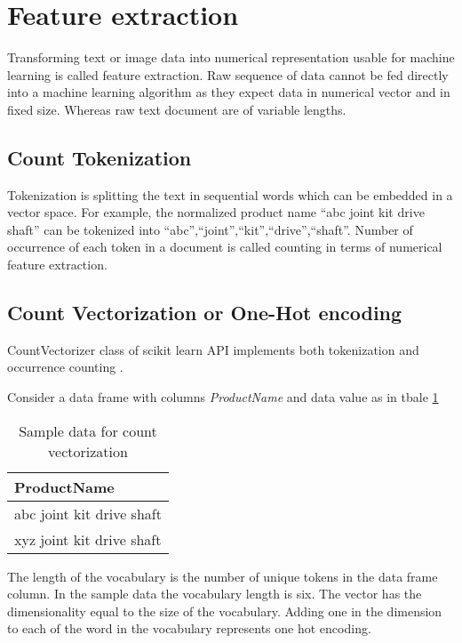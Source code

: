 \section{Feature extraction} \label{ch:feature-extraction}

Transforming text or image data into numerical representation usable for machine learning is called feature extraction. Raw sequence of data cannot be fed directly into a machine learning algorithm as they expect data in numerical vector and in fixed size. Whereas raw text document are of variable lengths. 

\subsection{Count Tokenization}

Tokenization is splitting the text in sequential words which can be embedded in a vector space.
For example, the normalized product name ``abc joint kit drive shaft'' can be tokenized into  ``abc'',``joint'',``kit'',``drive'',``shaft''. Number of occurrence of each token in a document is called counting in terms of numerical feature extraction.

\subsection{Count Vectorization or One-Hot encoding} \label{ch_countvector}


CountVectorizer class of scikit learn API implements both tokenization and occurrence counting \parencite{sklearn_api}. 

Consider a data frame with columns \textit{ProductName} and data value as in tbale \ref{table:count_vectorization}

\begin{table}[h]
    \centering
    \caption{Sample data for count vectorization}
    \label{table:count_vectorization}
    \begin{tabular}{ l }
          \toprule
          
          \textbf{ProductName}\\
          \midrule
          abc joint kit drive shaft\\
          xyz joint kit drive shaft\\
         
          \bottomrule
          \end{tabular}
\end{table}

The length of the vocabulary is the number of unique tokens in the data frame column. In the sample data the vocabulary length is six. The vector has the dimensionality equal to the size of the vocabulary. Adding one in the dimension to each of the word in the vocabulary represents one hot encoding.

